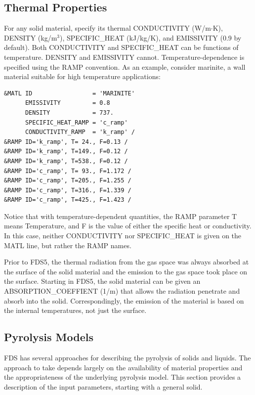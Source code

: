 \documentclass[11pt]{book}
\begin{document}
\subsection{Thermal Properties}

For any solid material, specify its thermal
{\ct CONDUCTIVITY} (W/m$\cdot$K), {\ct DENSITY} (kg/m$^3$),
{\ct SPECIFIC\_HEAT} (kJ/kg/K), and {\ct EMISSIVITY} (0.9 by default).
Both {\ct CONDUCTIVITY} and {\ct SPECIFIC\_HEAT} can be functions of
temperature. {\ct DENSITY} and {\ct EMISSIVITY} cannot.
Temperature-dependence is specified using the {\ct RAMP} convention.
As an example, consider marinite, a wall material suitable for high temperature applications:

\footnotesize
\begin{verbatim}
&MATL ID                 = 'MARINITE'
      EMISSIVITY         = 0.8
      DENSITY            = 737.
      SPECIFIC_HEAT_RAMP = 'c_ramp'
      CONDUCTIVITY_RAMP  = 'k_ramp' /
&RAMP ID='k_ramp', T= 24., F=0.13 /
&RAMP ID='k_ramp', T=149., F=0.12 /
&RAMP ID='k_ramp', T=538., F=0.12 /
&RAMP ID='c_ramp', T= 93., F=1.172 /
&RAMP ID='c_ramp', T=205., F=1.255 /
&RAMP ID='c_ramp', T=316., F=1.339 /
&RAMP ID='c_ramp', T=425., F=1.423 /
\end{verbatim}
\normalsize
Notice that with temperature-dependent quantities, the {\ct RAMP} parameter
{\ct T} means Temperature, and {\ct F} is the value of either
the specific heat or conductivity. In this case, neither {\ct CONDUCTIVITY} nor {\ct SPECIFIC\_HEAT} is given on the
{\ct MATL} line, but rather the {\ct RAMP} names.

Prior to FDS5, the thermal radiation from the gas space was always
absorbed at the surface of the solid material and the emission to the
gas space took place on the surface. Starting in FDS5, the solid
material can be given an {\ct ABSORPTION\_COEFFIENT} (1/m) that allows
the radiation penetrate and absorb into the solid. Correspondingly,
the emission of the material is based on the internal temperatures,
not just the surface.

\subsection{Pyrolysis Models}

FDS has several approaches for describing the pyrolysis of solids and liquids. The approach to take depends largely
on the availability of material properties and the appropriateness of the underlying pyrolysis model. This
section provides a description of the input parameters, starting with a general solid.
\end{document}

